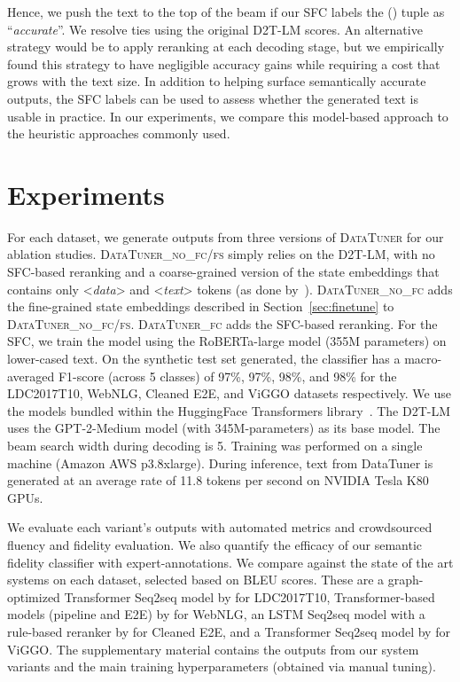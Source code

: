 \documentclass[11pt]{article}
\newcommand{\webnlg}{WebNLG\xspace}
\newcommand{\ldc}{LDC2017T10\xspace}
\newcommand{\viggo}{ViGGO\xspace}
\newcommand{\cleanedee}{Cleaned E2E\xspace}
\newcommand{\system}{\textsc{DataTuner}\xspace}
\newcommand{\systemFcPost}{\textsc{DataTuner\_fc}\xspace}
\newcommand{\systemNoFc}{\textsc{DataTuner\_no\_fc}\xspace}
\newcommand{\systemNoFcNoFs}{\textsc{DataTuner\_no\_fc/fs}\xspace}
\newcommand{\dtlm}{\textsc{D2T-LM}\xspace}
\newcommand{\sfc}{SFC\xspace}
\theoremstyle{definition}
\theoremstyle{break}
\newcommand{\specialtoken}[1]{\mbox{\textless \textit{#1}\textgreater}}
\begin{document}
Hence, we push the text  to the top of the beam if our SFC labels the () tuple as ``\textit{accurate}''. We resolve ties using the original \dtlm scores.
An alternative strategy would be to apply reranking at each decoding stage, but we empirically found this strategy to have negligible accuracy gains while requiring a cost that grows with the text size. In addition to helping surface semantically accurate outputs, the \sfc labels can be used to assess whether the generated text is usable in practice. In our experiments, we compare this model-based approach to the heuristic approaches commonly used.





\section{Experiments}

For each dataset, we generate outputs from three versions of \system for our ablation studies.
 \systemNoFcNoFs simply relies on the \dtlm, with no \sfc-based reranking and a coarse-grained version of the state embeddings that contains only \specialtoken{data} and \specialtoken{text} tokens (as done by~).
\systemNoFc adds the fine-grained state embeddings described in Section~\ref{sec:finetune} to \systemNoFcNoFs.
\systemFcPost adds the \sfc-based reranking. For the \sfc, we train the model using the RoBERTa-large model (355M parameters) on lower-cased text. On the synthetic test set generated, the classifier has a macro-averaged F1-score (across 5 classes) of 97\%, 97\%, 98\%, and 98\% for the \ldc, \webnlg, \cleanedee, and \viggo datasets respectively. We use the models bundled within the HuggingFace Transformers library~\cite{Wolf2019HuggingFacesTS}. The \dtlm uses the GPT-2-Medium model (with 345M-parameters) as its base model. The beam search width during decoding is 5. Training was performed on a single machine (Amazon AWS p3.8xlarge). During inference, text from DataTuner is generated at an average rate of 11.8 tokens per second on NVIDIA Tesla K80 GPUs.

We evaluate each variant's outputs with automated metrics and crowdsourced fluency and fidelity evaluation. We also quantify the efficacy of our semantic fidelity classifier with expert-annotations.
We compare against the state of the art systems on each dataset, selected based on BLEU scores. 
These are a graph-optimized Transformer Seq2seq model by  for \ldc, Transformer-based models (pipeline and E2E) by  for \webnlg, an LSTM Seq2seq model with a rule-based reranker by  for \cleanedee, and a Transformer Seq2seq model by  for \viggo. The supplementary material contains the outputs from our system variants and the main training hyperparameters (obtained via manual tuning).
\end{document}
